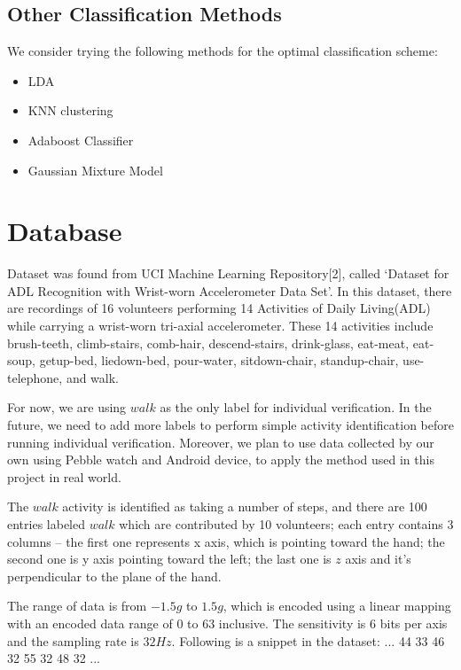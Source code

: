 \documentclass[10pt,twocolumn,letterpaper]{article}
\begin{document}
\subsection{Other Classification Methods}

We consider trying the following methods for the optimal classification scheme:
\begin{itemize}
\item LDA
\item KNN clustering
\item Adaboost Classifier
\item Gaussian Mixture Model

\end{itemize}

\section{Database}

Dataset was found from UCI Machine Learning Repository[2], called ‘Dataset for ADL Recognition with Wrist-worn Accelerometer Data Set’. In this dataset, there are recordings of 16 volunteers performing 14 Activities of Daily Living(ADL) while carrying a wrist-worn tri-axial accelerometer. These 14 activities include brush-teeth, climb-stairs, comb-hair, descend-stairs, drink-glass, eat-meat, eat-soup, getup-bed, liedown-bed, pour-water, sitdown-chair, standup-chair, use-telephone, and walk.

For now, we are using $walk$ as the only label for individual verification. In the future, we need to add more labels to perform simple activity identification before running individual verification. Moreover, we plan to use data collected by our own using Pebble watch and Android device, to apply the method used in this project in real world.

The $walk$ activity is identified as taking a number of steps, and there are 100 entries labeled $walk$ which are contributed by 10 volunteers; each entry contains 3 columns -- the first one represents x axis, which is pointing toward the hand; the second one is y axis pointing toward the left; the last one is $z$ axis and it’s perpendicular to the plane of the hand.

The range of data is from $-1.5g$ to $1.5g$, which is encoded using a linear mapping with an encoded data range of 0 to 63 inclusive. The sensitivity is 6 bits per axis and the sampling rate is $32Hz$. Following is a snippet in the dataset:\newline
... 44 33 46 32 55 32 48 32\newline
...\newline
\end{document}

